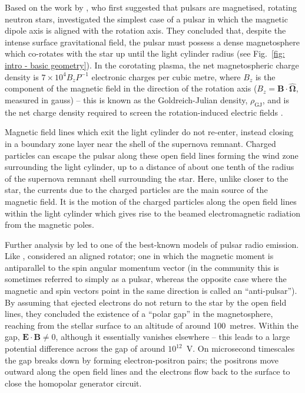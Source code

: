 Based on the work by \citet{Gxxx1968}, who first suggested that pulsars are magnetised, rotating neutron stars, \citet{GJxx1969} investigated the simplest case of a pulsar in which the magnetic dipole axis is aligned with the rotation axis. They concluded that, despite the intense surface gravitational field, the pulsar must possess a dense magnetosphere which co-rotates with the star up until the light cylinder radius (see Fig.~\ref{fig: intro - basic geometry}). In the corotating plasma, the net magnetospheric charge density is $7\times10^4 B_z P^{-1}$ electronic charges per cubic metre, where $B_z$ is the component of the magnetic field in the direction of the rotation axis ($B_z = \mathbf{B}\cdot\mathbf{\hat{\Omega}}$, measured in gauss) -- this is known as the Goldreich-Julian density, $\rho_\mathrm{GJ}$, and is the net charge density required to screen the rotation-induced electric fields \citep{GJxx1969}.

Magnetic field lines which exit the light cylinder do not re-enter, instead closing in a boundary zone layer near the shell of the supernova remnant. Charged particles can escape the pulsar along these open field lines forming the wind zone surrounding the light cylinder, up to a distance of about one tenth of the radius of the supernova remnant shell surrounding the star. Here, unlike closer to the star, the currents due to the charged particles are the main source of the magnetic field. It is the motion of the charged particles along the open field lines within the light cylinder which gives rise to the beamed electromagnetic radiation from the magnetic poles.

Further analysis by \citet{RSxx1975} led to one of the best-known models of pulsar radio emission. %
Like \citet{GJxx1969}, \citet{RSxx1975} considered an aligned rotator; one in which the magnetic moment is antiparallel to the spin angular momentum vector (in the community this is sometimes referred to simply as a pulsar, whereas the opposite case where the magnetic and spin vectors point in the same direction is called an ``anti-pulsar''). By assuming that ejected electrons do not return to the star by the open field lines, they concluded the existence of a ``polar gap'' in the magnetosphere, reaching from the stellar surface to an altitude of around 100~metres. Within the gap, $\mathbf{E}\cdot\mathbf{B} \neq 0$, although it essentially vanishes elsewhere -- this leads to a large potential difference across the gap of around $10^{12}$~V. On microsecond timescales the gap breaks down by forming electron-positron pairs; the positrons move outward along the open field lines and the electrons flow back to the surface to close the homopolar generator circuit.

